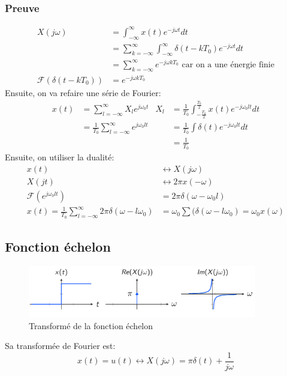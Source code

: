\documentclass{report}
\begin{document}
\subsubsection{Preuve}
\begin{align*}
X(j\omega) &= \int_{-\infty}^{\infty} x(t) e^{-j \omega t} dt\\
&= \sum_{k = -\infty}^{\infty} \int_{-\infty}^{\infty} \delta(t- kT_0) e^{-j \omega t} dt\\
&= \sum_{k = -\infty}^{\infty} e^{-j \omega k T_0} \text{ car on a une énergie finie}\\
\mathcal{F}(\delta(t-kT_0)) &= e^{-j\omega k T_0}
\end{align*}
Ensuite, on va refaire une série de Fourier:
\begin{align*}
x(t) &= \sum_{l = -\infty}^{\infty} X_l e^{j\omega_0 t} & X_l &=  \frac{1}{T_0} \int_{-\frac{T_0}{2}}^{\frac{T_0}{2}} x(t) e^{-j \omega_0 lt} dt\\
&= \frac{1}{T_0} \sum_{l = -\infty}^{\infty} e^{j\omega_0 lt} & &= \frac{1}{T_0} \int \delta(t) e^{-j \omega_0 lt} dt\\
& & &= \frac{1}{T_0}
\end{align*} %
Ensuite, on utiliser la dualité:
\begin{align*}
x(t) &\longleftrightarrow X(j\omega)\\
X(jt) &\longleftrightarrow 2\pi x(-\omega)\\
\mathcal{F}(e^{j\omega_0 lt}) &= 2 \pi \delta(\omega - \omega_0 l)\\
x(t) = \frac{1}{T_0} \sum_{l = - \infty}^{\infty} 2 \pi \delta(\omega - l \omega_0) &= \omega_0 \sum (\delta(\omega -l \omega_0) = \omega_0 x(\omega)
\end{align*}

\subsection{Fonction échelon}
\begin{figure}[H]
\centering
\includegraphics[width=10cm]{img/echeF.png}
\caption{Transformé de la fonction échelon}
\end{figure}
Sa transformée de Fourier est:
\begin{equation}
x(t) = u(t) \longleftrightarrow X(j\omega) = \pi \delta(t) + \frac{1}{j \omega}
\end{equation}
\end{document}
